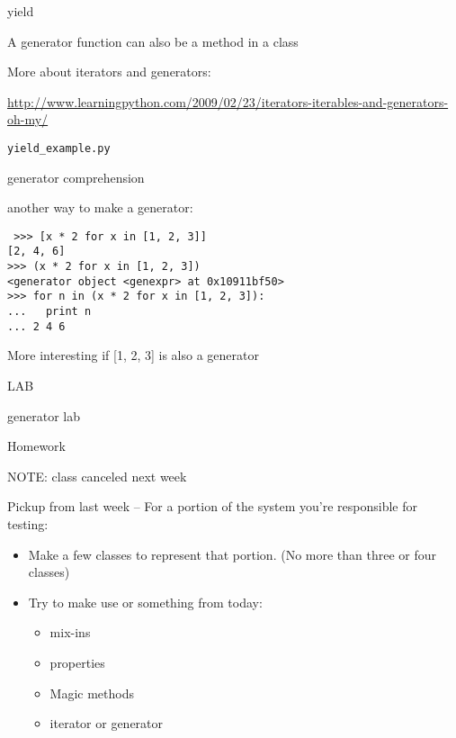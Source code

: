 \documentclass{beamer}
\begin{document}
\begin{frame}[fragile]{yield}

{\Large A generator function can also be a method in a class}

\vfill
{\Large More about iterators and generators:}

\vfill
\url{http://www.learningpython.com/2009/02/23/iterators-iterables-and-generators-oh-my/}

\vfill
\verb|yield_example.py|
\end{frame}

\begin{frame}[fragile]{generator comprehension}

{\Large another way to make a generator:}

\begin{verbatim}
￼>>> [x * 2 for x in [1, 2, 3]]
[2, 4, 6]
>>> (x * 2 for x in [1, 2, 3])
<generator object <genexpr> at 0x10911bf50>
>>> for n in (x * 2 for x in [1, 2, 3]):
...   print n
... 2 4 6
\end{verbatim}

\vfill
More interesting if [1, 2, 3] is also a generator

\end{frame}


\begin{frame}[fragile]{LAB}

{\Large generator lab}

\end{frame}


\begin{frame}[fragile]{Homework}

{\LARGE NOTE: class canceled next week}

\vfill
{\Large Pickup from last week -- For a portion of the system you're responsible for testing:}
\begin{itemize}
  \item Make a few classes to represent that portion. (No more than three or
        four classes)
  \item Try to make use or something from today:
  \begin{itemize}
    \item mix-ins
    \item properties
    \item Magic methods
    \item iterator or generator
  \end{itemize}
\end{itemize}

\vfill
\end{frame}
\end{document}
